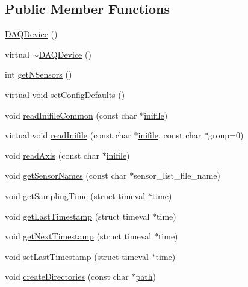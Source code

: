 \subsection*{Public Member Functions}
\begin{DoxyCompactItemize}
\item 
\hyperlink{classDAQDevice_adcc18d71d95de6d875f99894383092f6}{D\-A\-Q\-Device} ()
\item 
virtual \hyperlink{classDAQDevice_a2fb9f1fe7ff9496d52654bda6b1a099b}{$\sim$\-D\-A\-Q\-Device} ()
\item 
int \hyperlink{classDAQDevice_aa077dc208e0af098a95c75a97dcb4a16}{get\-N\-Sensors} ()
\item 
virtual void \hyperlink{classDAQDevice_a7685cec80865752cc0ef3ab49c6c2277}{set\-Config\-Defaults} ()
\item 
void \hyperlink{classDAQDevice_aedf0ba7667fd7e0952f04878af2d3bb4}{read\-Inifile\-Common} (const char $\ast$\hyperlink{classDAQDevice_aeacc409b639f3ed09cfdbd9b2c3e7d09}{inifile})
\item 
virtual void \hyperlink{classDAQDevice_a47c1cf880beb17950a575168274bc213}{read\-Inifile} (const char $\ast$\hyperlink{classDAQDevice_aeacc409b639f3ed09cfdbd9b2c3e7d09}{inifile}, const char $\ast$group=0)
\item 
void \hyperlink{classDAQDevice_ac1fa63e8be022587c80af60a67fb0893}{read\-Axis} (const char $\ast$\hyperlink{classDAQDevice_aeacc409b639f3ed09cfdbd9b2c3e7d09}{inifile})
\item 
void \hyperlink{classDAQDevice_adb56a07d66555732a901196519b1b963}{get\-Sensor\-Names} (const char $\ast$sensor\-\_\-list\-\_\-file\-\_\-name)
\item 
void \hyperlink{classDAQDevice_aee072d124ed6eb99003d24233f3eb5f6}{get\-Sampling\-Time} (struct timeval $\ast$time)
\item 
void \hyperlink{classDAQDevice_a6351102955977889363de75de88436f2}{get\-Last\-Timestamp} (struct timeval $\ast$time)
\item 
void \hyperlink{classDAQDevice_ae8c54de957f24848f9882d427ccda1f1}{get\-Next\-Timestamp} (struct timeval $\ast$time)
\item 
void \hyperlink{classDAQDevice_afc9b0a86f2c4d7a2dbf099d8eebade23}{set\-Last\-Timestamp} (struct timeval $\ast$time)
\item 
void \hyperlink{classDAQDevice_add887304744674aae4d21b9988437dc5}{create\-Directories} (const char $\ast$\hyperlink{classDAQDevice_a388a037825fdd2248eb1cadf15780bcd}{path})
\item 

\end{DoxyCompactItemize}
